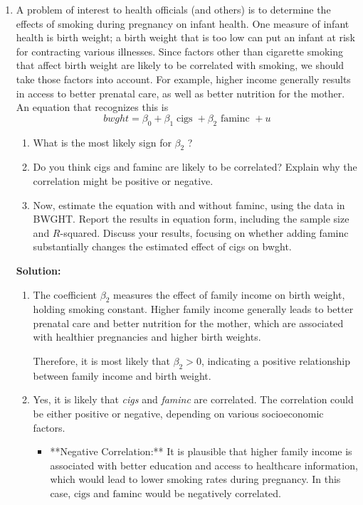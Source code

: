 \documentclass[12pt]{article}
\begin{document}
\begin{enumerate}

\item A problem of interest to health officials (and others) is to determine the effects of smoking during pregnancy on infant health. One measure of infant health is birth weight; a birth weight that is too low can put an infant at risk for contracting various illnesses. Since factors other than cigarette smoking that affect birth weight are likely to be correlated with smoking, we should take those factors into account. For example, higher income generally results in access to better prenatal care, as well as better nutrition for the mother. An equation that recognizes this is
$$
b w g h t=\beta_0+\beta_1 \operatorname{cigs}+\beta_2 \text { faminc }+u
$$
\begin{enumerate}
    \item What is the most likely sign for $\beta_2$ ?
\item Do you think cigs and faminc are likely to be correlated? Explain why the correlation might be positive or negative.
\item Now, estimate the equation with and without faminc, using the data in BWGHT. Report the results in equation form, including the sample size and $R$-squared. Discuss your results, focusing on whether adding faminc substantially changes the estimated effect of cigs on bwght.
\end{enumerate}


{\color{blue}
\noindent \textbf{Solution:}

\begin{enumerate}
    \item The coefficient \( \beta_2 \) measures the effect of family income on birth weight, holding smoking constant. Higher family income generally leads to better prenatal care and better nutrition for the mother, which are associated with healthier pregnancies and higher birth weights.

Therefore, it is most likely that \( \beta_2 > 0 \), indicating a positive relationship between family income and birth weight.

\item Yes, it is likely that \textit{cigs} and \textit{faminc} are correlated. The correlation could be either positive or negative, depending on various socioeconomic factors.

\begin{itemize}
    \item **Negative Correlation:** It is plausible that higher family income is associated with better education and access to healthcare information, which would lead to lower smoking rates during pregnancy. In this case, \( \text{cigs} \) and \( \text{faminc} \) would be negatively correlated.
    

\end{itemize}
\end{enumerate}}
\end{enumerate}
\end{document}
